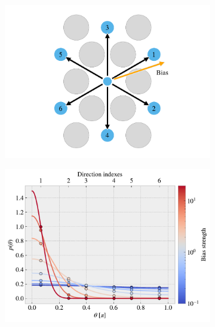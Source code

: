 \begin{figure}[h]
  \centering
  \begin{subfigure}[t]{0.48\textwidth}
      \centering
      \includegraphics[width=\textwidth]{figures/system/bias_prob_a.pdf}
      \caption{}
      \label{fig:bias_prob_a}
    \end{subfigure}
    \hfill
    \begin{subfigure}[t]{0.48\textwidth}
      \centering
      \includegraphics[width=\textwidth]{figures/system/bias_prob_b.pdf}
      \caption{}
      \label{fig:bias_prob_b}
  \end{subfigure}
  \hfill

\end{figure}
